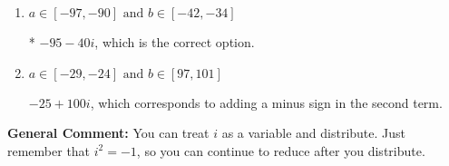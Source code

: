 \documentclass{extbook}[14pt]
\begin{document}
\begin{enumerate}
{\begin{enumerate}[label=\Alph*.]
 $-25 - 100 i$, which corresponds to adding a minus sign in the first term.
\item \( a \in [-97, -90] \text{ and } b \in [-42, -34] \)

* $-95 - 40 i$, which is the correct option.
\item \( a \in [-29, -24] \text{ and } b \in [97, 101] \)

 $-25 + 100 i$, which corresponds to adding a minus sign in the second term.
\end{enumerate}

\textbf{General Comment:} You can treat $i$ as a variable and distribute. Just remember that $i^2=-1$, so you can continue to reduce after you distribute.
}
\end{enumerate}
\end{document}
